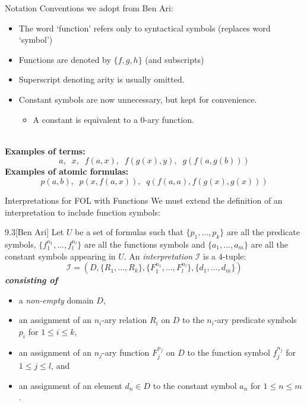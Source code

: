 \begin{wideslide}[bm=,toc=]{Notation}
Conventions we adopt from Ben Ari:
\begin{itemize}
\item The word `function' refers only to syntactical symbols (replaces word `symbol') 
\item Functions are denoted by $\{f,g,h\}$ (and subscripts)
\item Superscript denoting arity is usually omitted.
\item Constant symbols are now unnecessary, but kept for convenience.
\begin{itemize}
\item A constant is equivalent to a $0$-ary function.
\end{itemize}
\end{itemize}
~\\
{\bf Examples of terms:}
\[
  a,\;\; x,\;\; f(a,x),\;\; f(g(x),y),\;\; g(f(a,g(b)))
  \]
{\bf Examples of atomic formulas:}
\[
  p(a,b),\;\; p(x,f(a,x)),\;\; q(f(a,a), f(g(x),g(x)))
\]
\end{wideslide}

\begin{wideslide}[bm=,toc=]{Interpretations for FOL with Functions}
We must extend the definition of an interpretation to include function symbols:
\begin{defn}{9.3}[Ben Ari]
Let $U$ be a set of formulas such that $\{p_1,...,p_k\}$ are all the predicate
symbols, $\{f_1^{n_1},...,f_l^{n_l}\}$ are all the functions symbols and
$\{a_1,...,a_m\}$ are all the constant symbols appearing in $U$. An
\emph{interpretation} $\mathcal{I}$ is a $4$-tuple:
\[
  \mathcal{I} = (D, \{R_1,...,R_k\}, \{F_1^{n_1},...,F_l^{n_l}\},\{d_1,...,d_m\})
  \]
{\bf \emph{consisting of}}
\end{defn}
\vspace{-3ex}
\begin{itemize}
\item<2-> a \emph{non-empty} domain $D$,
\item<3-> an assignment of an $n_i$-ary relation $R_i$ on $D$ to the $n_i$-ary predicate 
      symbols $p_i$ for $1 \leq i \leq k$, 
\item<4-> an assignment of an $n_j$-ary function $F_j^{n_j}$ on $D$ to the
      function symbol $f_j^{n_j}$ for $1 \leq j \leq l$, and 
\item<5-> an assignment of an element $d_n \in D$ to the constant symbol $a_n$ for $1 \leq n \leq m$.
\end{itemize}
\end{wideslide}

